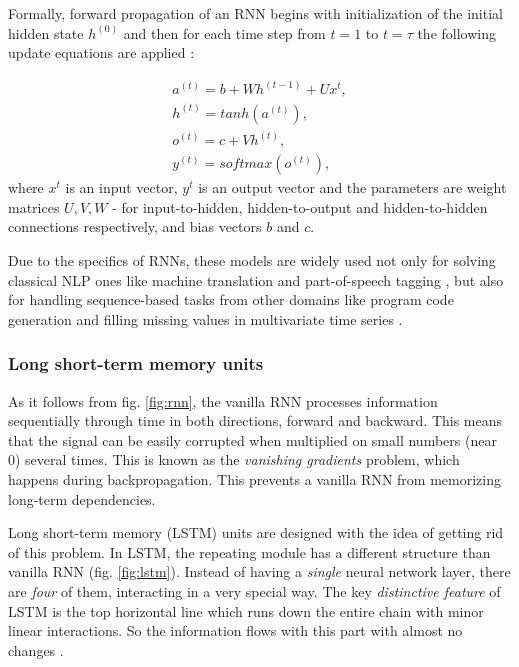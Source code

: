 Formally, forward propagation of an RNN begins with initialization of the initial hidden state $h^{(0)}$ and then for each time step from $t=1$ to $t=\tau$ the following update equations are applied \citep{Goodfellow-2016}:

\begin{equation}\label{eq:rnn}
\begin{gathered} 
    a^{(t)} = b+Wh^{(t-1)}+Ux^{t}, \\
    h^{(t)} = tanh(a^{(t)}), \\
    o^{(t)} = c+Vh^{(t)}, \\
    y^{(t)} = softmax(o^{(t)}),
\end{gathered}
\end{equation}
where $x^{t}$ is an input vector, $y^{t}$ is an output vector and the parameters are weight matrices $U, V, W$ - for input-to-hidden, hidden-to-output and hidden-to-hidden connections respectively, and bias vectors $b$ and $c$.

Due to the specifics of RNNs, these models are widely used not only for solving classical NLP ones like machine translation \citep{Chen-2018} and part-of-speech tagging \citep{Plank-2016}, but also for handling sequence-based tasks from other domains like program code generation \citep{Stehnii-2017} and filling missing values in multivariate time series \citep{Che-2016}.

\subsubsection{Long short-term memory units}
\label{sec:lstm}
As it follows from fig. \ref{fig:rnn}, the vanilla RNN processes information sequentially through time in both directions, forward and backward. This means that the signal can be easily corrupted when multiplied on small numbers (near 0) several times. This is known as the \textit{vanishing gradients} problem, which happens during backpropagation. This prevents a vanilla RNN from memorizing long-term dependencies.

Long short-term memory (LSTM) units are designed with the idea of getting rid of this problem. In LSTM, the repeating module has a different structure than vanilla RNN  (fig. \ref{fig:lstm}). Instead of having a \textit{single} neural network layer, there are \textit{four} of them, interacting in a very special way. The key \textit{distinctive feature} of LSTM is the top horizontal line which runs down the entire chain with minor linear interactions. So the information flows with this part with almost no changes \citep{Olah-2015}.

